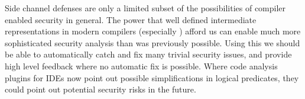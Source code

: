 Side channel defenses are only a limited subset of the possibilities of compiler enabled security in general.
The power that well defined intermediate representations in modern compilers (especially \ir{}) afford us can enable much more sophisticated security analysis than was previously possible.
Using this we should be able to automatically catch and fix many trivial security issues, and provide high level feedback where no automatic fix is possible.
Where code analysis plugins for IDEs now point out possible simplifications in logical predicates, they could point out potential security risks in the future.
